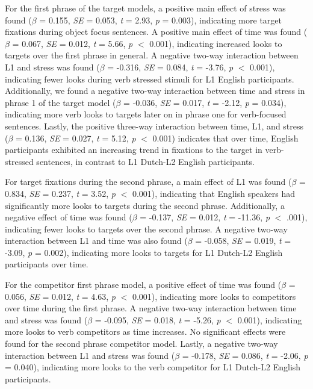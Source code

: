 For the first phrase of the target models, a positive main effect of stress was found ($\beta$ = 0.155, \textit{SE} = 0.053, \textit{t} = 2.93, \textit{p} = 0.003), indicating more target fixations during object focus sentences. A positive main effect of time was found ($\beta$ = 0.067, \textit{SE} = 0.012, \textit{t} = 5.66, \textit{p} $<$ 0.001), indicating increased looks to targets over the first phrase in general. A negative two-way interaction between L1 and stress was found ($\beta$ = -0.316, \textit{SE} = 0.084, \textit{t} = -3.76, \textit{p} $<$ 0.001), indicating fewer looks during verb stressed stimuli for L1 English participants. Additionally, we found a negative two-way interaction between time and stress in phrase 1 of the target model ($\beta$ = -0.036, \textit{SE} = 0.017, \textit{t} = -2.12, \textit{p} = 0.034), indicating more verb looks to targets later on in phrase one for verb-focused sentences. Lastly, the positive three-way interaction between time, L1, and stress ($\beta$ = 0.136, \textit{SE} = 0.027, \textit{t} = 5.12, \textit{p} $<$ 0.001) indicates that over time, English participants exhibited an increasing trend in fixations to the target in verb-stressed sentences, in contrast to L1 Dutch-L2 English participants.
 
 For target fixations during the second phrase, a main effect of L1 was found ($\beta$ = 0.834, \textit{SE} = 0.237, \textit{t} = 3.52, \textit{p} $<$ 0.001), indicating that English speakers had significantly more looks to targets during the second phrase. Additionally, a negative effect of time was found ($\beta$ = -0.137, \textit{SE} = 0.012, \textit{t} = -11.36, \textit{p} $<$ .001), indicating fewer looks to targets over the second phrase. A negative two-way interaction between L1 and time was also found ($\beta$ = -0.058, \textit{SE} = 0.019, \textit{t} = -3.09, \textit{p} = 0.002), indicating more looks to targets for L1 Dutch-L2 English participants over time.

For the competitor first phrase model, a positive effect of time was found ($\beta$ = 0.056, \textit{SE} = 0.012, \textit{t} = 4.63, \textit{p} $<$ 0.001), indicating more looks to competitors over time during the first phrase. A negative two-way interaction between time and stress was found ($\beta$ = -0.095, \textit{SE} = 0.018, \textit{t} = -5.26, \textit{p} $<$ 0.001), indicating more looks to verb competitors as time increases. No significant effects were found for the second phrase competitor model. Lastly, a negative two-way interaction between L1 and stress was found ($\beta$ = -0.178, \textit{SE} = 0.086, \textit{t} = -2.06, \textit{p} = 0.040), indicating more looks to the verb competitor for L1 Dutch-L2 English participants.

